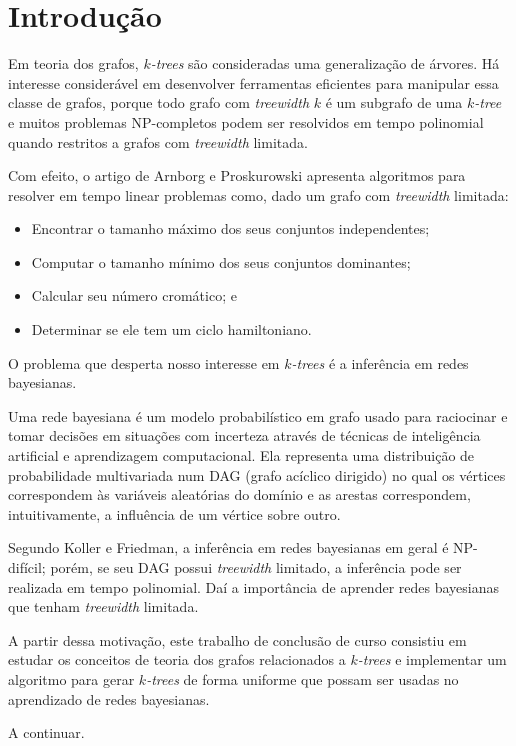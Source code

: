 \chapter{Introdução}
\label{cap:introducao}

Em teoria dos grafos, \emph{$k$-trees} são consideradas uma generalização de árvores. Há interesse considerável em desenvolver ferramentas eficientes para manipular essa classe de grafos, porque todo grafo com \emph{treewidth} $k$ é um subgrafo de uma \emph{$k$-tree} e muitos problemas NP-completos podem ser resolvidos em tempo polinomial quando restritos a grafos com \emph{treewidth} limitada.

Com efeito, o artigo de Arnborg e Proskurowski\cite{arnborg} apresenta algoritmos para resolver em tempo linear problemas como, dado um grafo com \emph{treewidth} limitada:

\begin{itemize}
  \item Encontrar o tamanho máximo dos seus conjuntos independentes;
  \item Computar o tamanho mínimo dos seus conjuntos dominantes;
  \item Calcular seu número cromático; e
  \item Determinar se ele tem um ciclo hamiltoniano.
\end{itemize}

O problema que desperta nosso interesse em \emph{$k$-trees} é a inferência em redes bayesianas.

Uma rede bayesiana é um modelo probabilístico em grafo usado para raciocinar e tomar decisões em situações com incerteza através de técnicas de inteligência artificial e aprendizagem computacional. Ela representa uma distribuição de probabilidade multivariada num DAG (grafo acíclico dirigido) no qual os vértices correspondem às variáveis aleatórias do domínio e as arestas correspondem, intuitivamente, a influência de um vértice sobre outro.

Segundo Koller e Friedman\cite{koller}, a inferência em redes bayesianas em geral é NP-difícil; porém, se seu DAG possui \emph{treewidth} limitado, a inferência pode ser realizada em tempo polinomial. Daí a importância de aprender redes bayesianas que tenham \emph{treewidth} limitada.

A partir dessa motivação, este trabalho de conclusão de curso consistiu em estudar os conceitos de teoria dos grafos relacionados a \emph{$k$-trees} e implementar um algoritmo para gerar \emph{$k$-trees} de forma uniforme que possam ser usadas no aprendizado de redes bayesianas.

\vspace{2em}

A continuar. %
